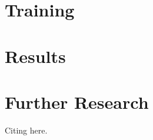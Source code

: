 \documentclass[12pt]{article}    %
\begin{document}

\section{Training}


\cite{Radeck-Arneth2015}
\cite{heafield-2011-kenlm}

\section{Results}


\section{Further Research}

Citing \cite{agarwal-zesch-2019-german} here.

\printbibliography
\end{document}

